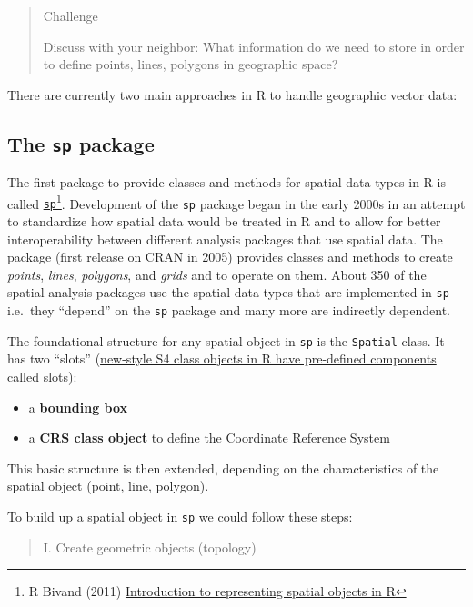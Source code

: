 \documentclass[]{book}
\let\rmarkdownfootnote\footnote%
\def\footnote{\protect\rmarkdownfootnote}
\theoremstyle{definition}
\theoremstyle{definition}
\theoremstyle{definition}
\theoremstyle{remark}
\begin{document}
\begin{quote}
Challenge

Discuss with your neighbor: What information do we need to store in
order to define points, lines, polygons in geographic space?
\end{quote}

There are currently two main approaches in R to handle geographic vector
data:

\subsection{\texorpdfstring{The \texttt{sp}
package}{The sp package}}\label{the-sp-package}

The first package to provide classes and methods for spatial data types
in R is called
\href{https://cran.r-project.org/package=sp}{\texttt{sp}}\footnote{R
  Bivand (2011)
  \href{http://geostat-course.org/system/files/monday_slides.pdf}{Introduction
  to representing spatial objects in R}}. Development of the \texttt{sp}
package began in the early 2000s in an attempt to standardize how
spatial data would be treated in R and to allow for better
interoperability between different analysis packages that use spatial
data. The package (first release on CRAN in 2005) provides classes and
methods to create \emph{points}, \emph{lines}, \emph{polygons}, and
\emph{grids} and to operate on them. About 350 of the spatial analysis
packages use the spatial data types that are implemented in \texttt{sp}
i.e.~they ``depend'' on the \texttt{sp} package and many more are
indirectly dependent.

The foundational structure for any spatial object in \texttt{sp} is the
\texttt{Spatial} class. It has two ``slots''
(\href{http://stackoverflow.com/a/4714080}{new-style S4 class objects in
R have pre-defined components called slots}):

\begin{itemize}
\item
  a \textbf{bounding box}
\item
  a \textbf{CRS class object} to define the Coordinate Reference System
\end{itemize}

This basic structure is then extended, depending on the characteristics
of the spatial object (point, line, polygon).

To build up a spatial object in \texttt{sp} we could follow these steps:

\begin{quote}
I. Create geometric objects (topology)
\end{quote}
\end{document}
